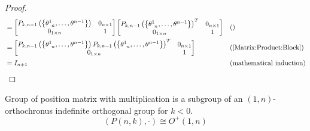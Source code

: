 \documentclass[../main.tex]{subfiles}
\begin{document}
\begin{proof}
\begin{align*}
        &=
        \begin{bmatrix}
            P_{k,n-1}\left(\left\{\tensor{\theta}{^1_{n}},\dots,\tensor{\theta}{^{n-1}}\right\}\right) & 0_{n\times 1} \\
            0_{1\times n}                                                                              & 1             \\
        \end{bmatrix}
        \begin{bmatrix}
            P_{k,n-1}\left(\left\{\tensor{\theta}{^1_{n}},\dots,\tensor{\theta}{^{n-1}}\right\}\right)^T & 0_{n\times 1} \\
            0_{1\times n}                                                                              & 1             \\
        \end{bmatrix} && \text{()} \\
        &=
        \begin{bmatrix}
            P_{k,n-1}\left(\left\{\tensor{\theta}{^1_{n}},\dots,\tensor{\theta}{^{n-1}}\right\}\right)P_{k,n-1}\left(\left\{\tensor{\theta}{^1_{n}},\dots,\tensor{\theta}{^{n-1}}\right\}\right)^T & 0_{n\times 1} \\
            0_{1\times n}                                                                              & 1             \\
        \end{bmatrix} && \text{(\cref{Matrix:Product:Block})} \\
        &= I_{n+1} && \text{(mathematical induction)}
    \end{align*}
\end{proof}
\begin{proposition}
    Group of position matrix with multiplication is a subgroup of an $\left(1,n\right)$-orthochronus indefinite orthogonal group for $k<0$.
    \begin{equation*}
        \left(P\left(n, k\right),\cdot\right)\cong O^+\left(1,n\right)
    \end{equation*}
\end{proposition}
\end{document}
